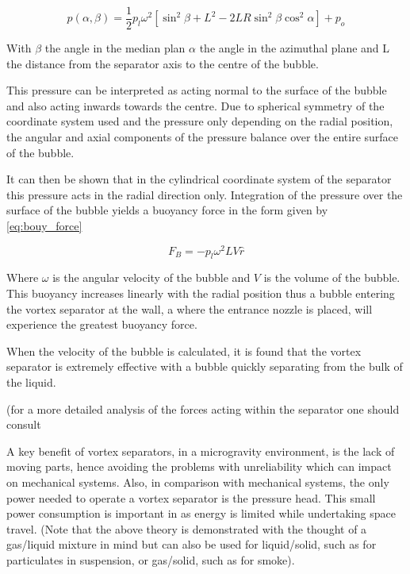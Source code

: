 \documentclass[12pt]{article}
\begin{document}
\begin{equation}
p(\alpha,\beta)=\frac{1}{2}p_l \omega^2\left[\sin^2{\beta}+L^2-2LR\sin^2{\beta}\cos^2{\alpha}\right]+p_o
\label{eq:bubble}
\end{equation}

With $\beta$ the angle in the median plan $\alpha$ the angle in the azimuthal plane and L the distance from the separator axis to the centre of the bubble.

This pressure can be interpreted as acting normal to the surface of the bubble and also acting inwards towards the centre. Due to spherical symmetry of the coordinate system used and the pressure only depending on the radial position, the angular and axial components of the pressure balance over the entire surface of the bubble. 

It can then be shown that in the cylindrical coordinate system of the separator this pressure acts in the radial direction only. Integration of the pressure over the surface of the bubble yields a buoyancy force in the form given by \cref{eq:bouy_force}

\begin{equation}
F_B=-p_l\omega^2 LV\hat{r}
\label{eq:bouy_force}
\end{equation}

Where $\omega$ is the angular velocity of the bubble and $V$ is the volume of the bubble. This buoyancy increases linearly with the radial position thus a bubble entering the vortex separator at the wall, a where the entrance nozzle is placed, will experience the greatest buoyancy force.



When the velocity of the bubble is calculated, it is found that the vortex separator is extremely effective with a bubble quickly separating from the bulk of the liquid.

(for a more detailed analysis of the forces acting within the separator one should consult 

A key benefit of vortex separators, in a microgravity environment, is the lack of moving parts, hence avoiding the problems with unreliability which can impact on mechanical systems. Also, in comparison with mechanical systems, the only power needed to operate a vortex separator is the pressure head. This small power consumption is important in as energy is limited while undertaking space travel. 
(Note that the above theory is demonstrated with the thought of a gas/liquid mixture in mind but can also be used for liquid/solid, such as for particulates in suspension, or gas/solid, such as for smoke).
\end{document}
